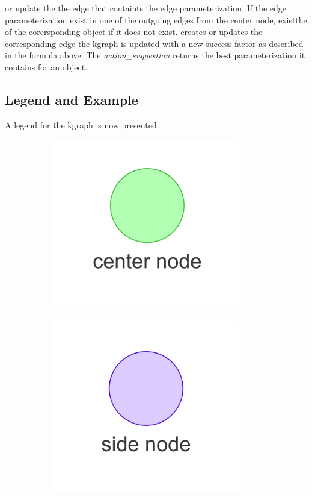 or update the the edge that containts the edge parameterization. If the edge parameterization exist in one of the outgoing edges from the center node, existthe of the corersponding object if it does not exist. 
creates or updates the corresponding edge  the \ac{kgraph} is updated with a new success factor as described in the formula above. The \textit{action\_suggestion} returns the best parameterization it contains for an object.\bs

\subsection{Legend and Example}
A legend for the \ac{kgraph} is now presented.\bs

\begin{figure}[H]
    \centering
    \begin{subfigure}{0.3\textwidth}
    \centering
    \includegraphics[width=0.9\textwidth]{figures/proposed_method/center_node}
    \caption{}%
    \end{subfigure}
    \begin{subfigure}{0.3\textwidth}
    \centering
    \includegraphics[width=0.9\textwidth]{figures/proposed_method/side_node}

\end{subfigure}
\end{figure}
